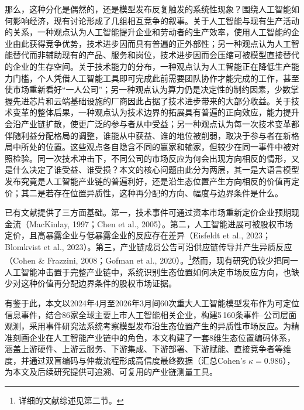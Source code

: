 \documentclass[11pt,fontset=fandol,a4paper]{ctexart}
\newcommand{\changed}[1]{#1}
\begin{document}
\changed{那么，这种分化是偶然的，还是模型发布反复触发的系统性现象？围绕人工智能如何影响经济，现有讨论形成了几组相互竞争的叙事。关于人工智能与现有生产活动的关系，一种观点认为人工智能提升企业和劳动者的生产效率，使用人工智能的企业由此获得竞争优势，技术进步因而具有普遍的正外部性；另一种观点认为人工智能替代而非辅助现有的产品、服务和岗位，技术进步因而会压缩可被模型直接替代的企业的生存空间。关于技术能力的分布，一种观点认为人工智能正在降低生产能力门槛，个人凭借人工智能工具即可完成此前需要团队协作才能完成的工作，甚至使市场重新看好“一人公司”；另一种观点认为算力仍是决定性的制约因素，少数掌握先进芯片和云端基础设施的厂商因此占据了技术进步带来的大部分收益。关于技术变革的整体后果，一种观点认为技术边界的拓展具有普遍的正向效应，能力提升会沿产业链扩散，使更广泛的参与者从中受益；另一种观点认为每一次技术变革都伴随利益分配格局的调整，谁能从中获益、谁的地位被削弱，取决于参与者在新格局中所处的位置。这些观点各自隐含不同的赢家和输家，但较少在同一事件中被对照检验。同一次技术冲击下，不同公司的市场反应为何会出现方向相反的情形，又是什么决定了谁受益、谁受损？本文的核心问题由此分为两层，其一是大语言模型发布究竟是人工智能产业链的普遍利好，还是沿生态位置产生方向相反的价值再定价；其二是若存在位置异质性，这种再分配的方向、幅度与边界条件是什么。}

\changed{已有文献提供了三方面基础。第一，技术事件可通过资本市场重新定价企业预期现金流（MacKinlay, 1997；Chen et al., 2005）。第二，人工智能进展可被股权市场定价，且高暴露企业与低暴露企业的反应存在差异（Eisfeldt et al., 2023；Blomkvist et al., 2023）。第三，产业链成员公告可沿供应链传导并产生异质反应（Cohen \& Frazzini, 2008；Gofman et al., 2020）。\footnote{详细的文献综述见第二节。}然而，现有研究仍较少把同一人工智能冲击置于完整产业链中，系统识别生态位置如何决定市场反应方向，也缺少对这种价值再分配边界条件的股权市场证据。}

\changed{有鉴于此，本文以2024年4月至2026年3月间60次重大人工智能模型发布作为可定位信息事件，结合86家全球主要上市人工智能相关企业，构建5\,160条事件--公司层面观测，采用事件研究法系统考察模型发布沿生态位置产生的异质性市场反应。为精准刻画企业在人工智能产业链中的角色，本文构建了一套8维生态位置编码体系，涵盖上游硬件、上游云服务、下游集成、下游部署、下游赋能、直接竞争者等维度，并通过双盲编码与仲裁流程形成高信度最终数据（汇总Cohen's $\kappa=0.986$），为本文及后续研究提供可追溯、可复用的产业链测量工具。}
\end{document}
